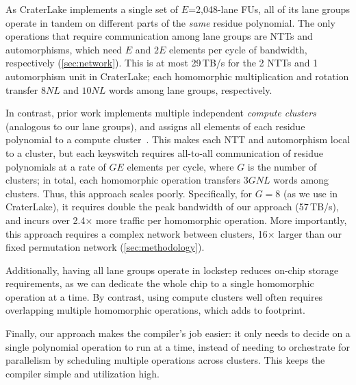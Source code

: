 As CraterLake implements a single set of $E$=2,048-lane FUs, all of its lane
groups operate in tandem on different parts of the \emph{same} residue
polynomial. The only operations that require communication among lane groups
are NTTs and automorphisms, which need $E$ and $2E$ elements per cycle of
bandwidth, respectively (\autoref{sec:network}). This is at most 29\,TB/s for
the 2 NTTs and 1 automorphism unit in CraterLake; each homomorphic multiplication
and rotation transfer $8NL$ and $10NL$ words among lane groups, respectively.

In contrast, prior work implements multiple independent \emph{compute clusters}
(analogous to our lane groups), and assigns all elements of each residue
polynomial to a compute cluster~\cite{riazi:asplos20:heax}.
This makes each NTT and automorphism local to a cluster, but each keyswitch
requires all-to-all communication of residue polynomials at a rate of $GE$
elements per cycle, where $G$ is the number of clusters; in total, each
homomorphic operation transfers $3GNL$ words among clusters. Thus, this
approach scales poorly. Specifically, for $G=8$ (as we use in CraterLake), it
requires double the peak bandwidth of our approach (57\,TB/s), and incurs over
2.4$\times$ more traffic per homomorphic operation. More importantly, this
approach requires a complex network between clusters, 16$\times$ larger than
our fixed permutation network (\autoref{sec:methodology}).

Additionally, having all lane groups operate in lockstep reduces on-chip
storage requirements, as we can dedicate the whole chip to a single homomorphic
operation at a time. By contrast, using compute clusters well often requires
overlapping multiple homomorphic operations, which adds to footprint.

Finally, our approach makes the compiler's job easier: it only needs to decide
on a single polynomial operation to run at a time, instead of needing to
orchestrate for parallelism by scheduling multiple operations across clusters.
This keeps the compiler simple and utilization high.

